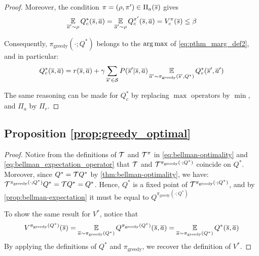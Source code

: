 \begin{proof}
Moreover, the condition $\pi=(\rho, \pi')\in\Pi_a(\overline{s})$ gives
\begin{equation*}
   \operatorname*{\mathbb{E}}\limits_{\overline{a}'\sim\rho} Q_c^{*}(\overline{s}, \overline{a}) = \operatorname*{\mathbb{E}}\limits_{\overline{a}'\sim\rho} Q_c^{\pi'}(\overline{s}, \overline{a}) = V_c^{\pi}(\overline{s}) \leq \beta
\end{equation*}

Consequently, $\pi_\text{greedy}(\cdot; Q^*)$ belongs to the $\operatorname*{arg\,max}$ of \eqref{eq:pthm_marg_def2}, and in particular:
\begin{equation*}
     Q_r^*(\overline{s}, \overline{a}) = r(\overline{s}, \overline{a}) + \gamma \sum_{\overline{s}'\in\mathcal{S}}  P(\overline{s}' | \overline{s}, \overline{a}) \operatorname*{\mathbb{E}}\limits_{\overline{a}'\sim\pi_\text{greedy}(\overline{s}', Q^*)} Q_r^*(\overline{s}', \overline{a}')
\end{equation*}

The same reasoning can be made for $Q_c^*$ by replacing $\max$ operators by $\min$, and $\Pi_a$ by $\Pi_r$.
\end{proof}

\subsection{Proposition \ref{prop:greedy_optimal}}
\begin{proof}
Notice from the definitions of $\mathcal{T}$ and $\mathcal{T}^\pi$ in \eqref{eq:bellman-optimality} and \eqref{eq:bellman_expectation_operator} that $\mathcal{T}$ and $\mathcal{T}^{\pi_\text{greedy}(\cdot;Q^*)}$ coincide on $Q^*$. Moreover, since $Q^* = \mathcal{T} Q^*$ by \cref{thm:bellman-optimality}, we have: $    \mathcal{T}^{\pi_\text{greedy}(\cdot;Q^*)} Q^* = \mathcal{T} Q^* = Q^*
$.
Hence, $Q^*$ is a fixed point of $\mathcal{T}^{\pi_\text{greedy}(\cdot;Q^*)}$, and by \cref{prop:bellman-expectation} it must be equal to $Q^{\pi_\text{greedy}(\cdot;Q^*)}$

To show the same result for $V^*$, notice that 
\begin{equation*}
    V^{\pi_\text{greedy}(Q^*)}(\overline{s}) = \operatorname*{\mathbb{E}}\limits_{\overline{a}\sim\pi_\text{greedy}(Q^*)}Q^{\pi_\text{greedy}(Q^*)}(\overline{s},\overline{a}) = \operatorname*{\mathbb{E}}\limits_{\overline{a}\sim\pi_\text{greedy}(Q^*)}Q^*(\overline{s},\overline{a})
\end{equation*}
By applying the definitions of $Q^*$ and $\pi_\text{greedy}$, we recover the definition of $V^*$.
\end{proof}



